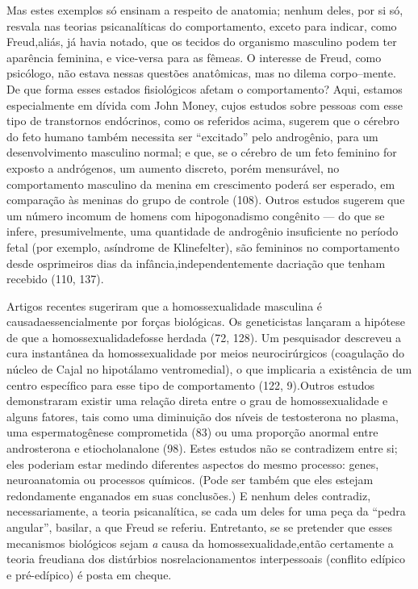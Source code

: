  Mas estes exemplos só ensinam a respeito de anatomia; nenhum deles, por
si só, resvala nas teorias psicanalíticas do comportamento, exceto para
indicar, como Freud,\idxfreud[|(] aliás, já havia notado, que os tecidos do
organismo masculino podem ter aparência feminina, e vice-versa para as
fêmeas. O interesse de Freud, como psicólogo, não estava nessas
questões anatômicas, mas no dilema\idxquest{} corpo--mente.\idxfreudmente{} De que forma esses
estados fisiológicos afetam o comportamento? Aqui, estamos
especialmente em dívida com John Money,\idxmoney{} cujos estudos sobre pessoas com
esse tipo de transtornos endócrinos, como os referidos acima, sugerem
que o cérebro do feto humano também necessita ser
``excitado'' pelo androgênio, para um
desenvolvimento masculino normal; e que, se o cérebro de um feto
feminino for exposto a andrógenos, um aumento discreto, porém
mensurável, no comportamento masculino da menina em crescimento poderá
ser esperado, em comparação às meninas do grupo de controle (108).
Outros estudos sugerem que um número incomum de homens com
hipogonadismo congênito --- do que se infere, presumivelmente, uma
quantidade de androgênio\idxandrn{} insuficiente no período fetal (por exemplo, a\idxsexod[|)]
síndrome de Klinefelter),\idxkline{} são femininos no comportamento desde os\idxsexopiden[|)]
primeiros dias da infância,\idxbissedese[|)] independentemente da\idxcondfsupr[|)] \mbox{criação} que tenham recebido (110, 137).\idxprenat[|)]

 Artigos recentes sugeriram que a homossexualidade\idxgenethomo{} masculina é causada\idxsexophomo[|(]
essencialmente por forças biológicas. Os geneticistas lançaram a
hipótese de que a homossexualidade\idxhomosbiol[|(] fosse herdada\idxhomoshera{} (72, 128). Um
pesquisador descreveu a cura instantânea da homossexualidade por meios
neurocirúrgicos\idxhomostrat{} (coagulação do núcleo de Cajal no hipotálamo
ventromedial), o que implicaria a existência de um centro específico
para esse tipo de comportamento (122, 9).\idxidenpre[|)] Outros estudos demonstraram
existir uma relação direta entre o grau de homossexualidade e alguns
fatores, tais como uma diminuição dos níveis de testosterona no plasma,
uma espermatogênese comprometida (83) ou uma proporção anormal entre
androsterona e \mbox{etio}cholanalone (98).\idxhormhomo{} Estes estudos não se contradizem
entre si; eles poderiam estar medindo diferentes aspectos do mesmo
processo: genes, neuroanatomia ou processos químicos. (Pode ser também
que eles estejam redondamente enganados em suas conclusões.) E nenhum
deles contradiz, necessariamente, a teoria psicanalítica, se cada um
deles for uma peça da ``pedra angular'',
basilar, a que Freud se referiu. Entretanto, se se pretender que esses
mecanismos biológicos sejam \textit{a} causa da \mbox{homossexua}lidade,\idxhomosbiol[|)] então
certamente a teoria freudiana dos distúrbios nos\idxhormdese[|)] relacionamentos
interpessoais (conflito edípico e pré-edípico)\idxconfe{} é posta em cheque.\idxsexophomo[|)]


